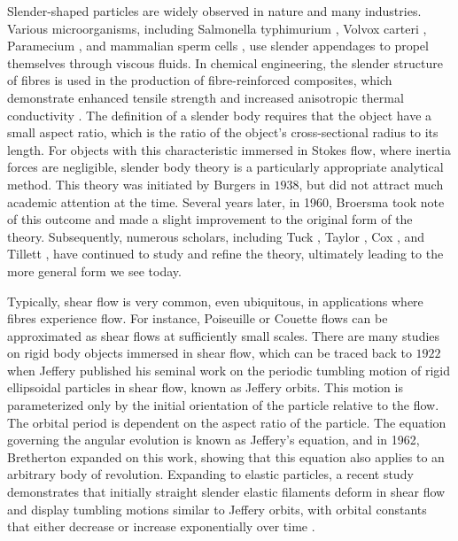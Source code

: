 \documentclass[12pt,MSc,twoside]{muthesis_2020}
\begin{document}
Slender-shaped particles are widely observed in nature and many industries. Various microorganisms, including Salmonella typhimurium \cite{lauga2009hydrodynamics}, Volvox carteri \cite{goldstein2015green}, Paramecium \cite{brennen1977fluid}, and mammalian sperm cells \cite{gaffney2011mammalian}, use slender appendages to propel themselves through viscous fluids. In chemical engineering, the slender structure of fibres is used in the production of fibre-reinforced composites, which demonstrate enhanced tensile strength and increased anisotropic thermal conductivity \cite{tekce2007effect}. The definition of a slender body requires that the object have a small aspect ratio, which is the ratio of the object's cross-sectional radius to its length. For objects with this characteristic immersed in Stokes flow, where inertia forces are negligible, slender body theory is a particularly appropriate analytical method. This theory was initiated by Burgers \cite{burgers1938motion} in $1938$, but did not attract much academic attention at the time. Several years later, in 1960, Broersma \cite{broersma1960rotational}\cite{broersma1960viscous} took note of this outcome and made a slight improvement to the original form of the theory. Subsequently, numerous scholars, including Tuck \cite{tuck1964some}\cite{tuck1970toward}, Taylor \cite{taylor1969motion}, Cox \cite{cox1970motion}\cite{cox1971motion}, and Tillett \cite{tillett1970axial}, have continued to study and refine the theory, ultimately leading to the more general form we see today. 

Typically, shear flow is very common, even ubiquitous, in applications where fibres experience flow. For instance, Poiseuille or Couette flows can be approximated as shear flows at sufficiently small scales. There are many studies on rigid body objects immersed in shear flow, which can be traced back to $1922$ when Jeffery \cite{jeffery1922motion} published his seminal work on the periodic tumbling motion of rigid ellipsoidal particles in shear flow, known as Jeffery orbits. This motion is parameterized only by the initial orientation of the particle relative to the flow. The orbital period is dependent on the aspect ratio of the particle. The equation governing the angular evolution is known as Jeffery's equation, and in 1962, Bretherton \cite{bretherton1962motion} expanded on this work, showing that this equation also applies to an arbitrary body of revolution. Expanding to elastic particles, a recent study demonstrates that initially straight slender elastic filaments deform in shear flow and display tumbling motions similar to Jeffery orbits, with orbital constants that either decrease or increase exponentially over time \cite{zuk2021universal}.
\end{document}
